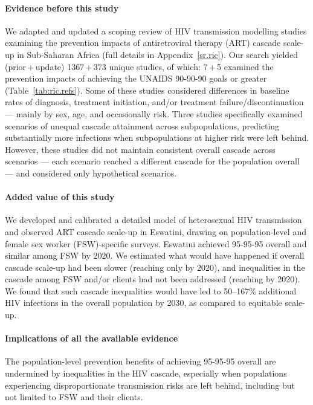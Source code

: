 \newcommand{\pu}[2]{#1\,+\,#2}
\begin{ric}
  \paragraph{Evidence before this study}
  We adapted and updated a scoping review of HIV transmission modelling studies examining
  the prevention impacts of antiretroviral therapy (ART) cascade scale-up in Sub-Saharan Africa
  (full details in Appendix~\ref{sr.ric}).
  Our search yielded (\pu{prior}{update}) \pu{1367}{373} unique studies, of which:
  \pu{7}{5} examined the prevention impacts of achieving
  the UNAIDS 90-90-90 goals or greater (Table~\ref{tab:ric.refs}).
  Some of these studies considered differences in baseline rates of
  diagnosis, treatment initiation, and/or treatment failure/discontinuation
  --- mainly by sex, age, and occasionally risk.
  Three studies specifically examined scenarios of unequal cascade attainment across subpopulations,
  predicting substantially more infections when subpopulations at higher risk were left behind.
    However, these studies did not maintain consistent overall cascade across scenarios
  --- \ie each scenario reached a different cascade for the population overall ---
  and considered only hypothetical scenarios.
  \paragraph{Added value of this study}
  We developed and calibrated a detailed model of heterosexual HIV transmission
  and observed ART cascade scale-up in Eswatini,
  drawing on population-level and female sex worker (FSW)-specific surveys.
  Eswatini achieved 95-95-95 overall and similar among FSW by 2020.
  We estimated what would have happened if
  overall cascade scale-up had been slower
  (reaching only \casmd by 2020), and
  inequalities in the cascade among FSW and/or clients had not been addressed
  (reaching \caslo by 2020).
  We found that such cascade inequalities
  would have led to 50--167\% additional HIV infections in the overall population by 2030,
  as compared to equitable scale-up.
  \paragraph{Implications of all the available evidence}
  The population-level prevention benefits of achieving 95-95-95 overall
  are undermined by inequalities in the HIV cascade, especially when
  populations experiencing disproportionate transmission risks are left behind,
  including but not limited to FSW and their clients.
\end{ric}
